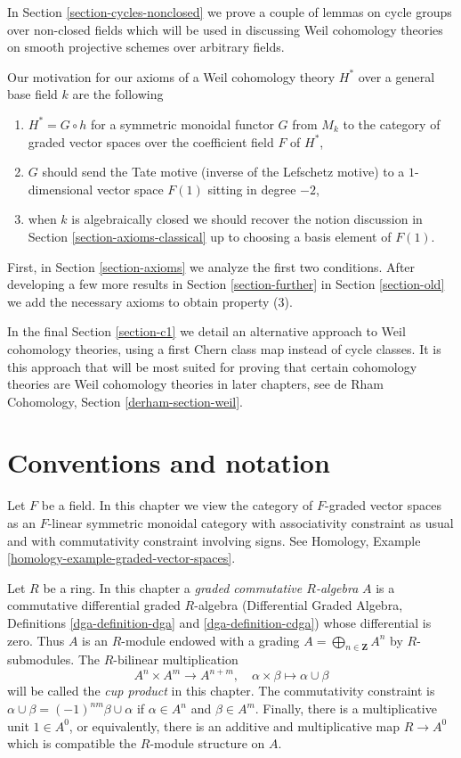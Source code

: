 \documentclass{stacks-project}
\theoremstyle{plain}
\theoremstyle{definition}
\theoremstyle{remark}
\numberwithin{equation}{subsection}
\begin{document}
\medskip\noindent
In Section \ref{section-cycles-nonclosed} we prove a couple of lemmas
on cycle groups over non-closed fields which will be used in discussing
Weil cohomology theories on smooth projective schemes over arbitrary fields.

\medskip\noindent
Our motivation for our axioms of a Weil cohomology theory $H^*$
over a general base field $k$ are the following
\begin{enumerate}
\item $H^* = G \circ h$ for a symmetric monoidal functor $G$ from $M_k$
to the category of graded vector spaces over the coefficient field $F$ of $H^*$,
\item $G$ should send the Tate motive (inverse of the Lefschetz motive)
to a $1$-dimensional vector space $F(1)$ sitting in degree $-2$,
\item when $k$ is algebraically closed we should recover the notion
discussion in Section \ref{section-axioms-classical}
up to choosing a basis element of $F(1)$.
\end{enumerate}
First, in Section \ref{section-axioms} we analyze the first two conditions.
After developing a few more results in Section \ref{section-further}
in Section \ref{section-old} we add the necessary axioms to obtain
property (3).

\medskip\noindent
In the final Section \ref{section-c1} we detail an alternative approach
to Weil cohomology theories, using a first Chern class map
instead of cycle classes. It is this approach that will be most
suited for proving that certain cohomology theories are Weil cohomology
theories in later chapters, see
de Rham Cohomology, Section \ref{derham-section-weil}.





\section{Conventions and notation}
\label{section-conventions}

\noindent
Let $F$ be a field. In this chapter we view the category of $F$-graded vector
spaces as an $F$-linear symmetric monoidal category with associativity
constraint as usual and with commutativity constraint involving signs.
See Homology, Example \ref{homology-example-graded-vector-spaces}.

\medskip\noindent
Let $R$ be a ring. In this chapter a
{\it graded commutative $R$-algebra} $A$ is a
commutative differential graded $R$-algebra
(Differential Graded Algebra, Definitions \ref{dga-definition-dga} and
\ref{dga-definition-cdga}) whose differential is zero. Thus $A$
is an $R$-module endowed with a grading
$A = \bigoplus_{n \in \mathbf{Z}} A^n$ by
$R$-submodules. The $R$-bilinear multiplication
$$
A^n \times A^m \longrightarrow A^{n + m},\quad
\alpha \times \beta \longmapsto \alpha \cup \beta
$$
will be called the {\it cup product} in this chapter.
The commutativity constraint is
$\alpha \cup \beta = (-1)^{nm} \beta \cup \alpha$ if
$\alpha \in A^n$ and $\beta \in A^m$. Finally, there is
a multiplicative unit $1 \in A^0$, or equivalently, there is an
additive and multiplicative map $R \to A^0$ which is compatible the
$R$-module structure on $A$.
\end{document}
